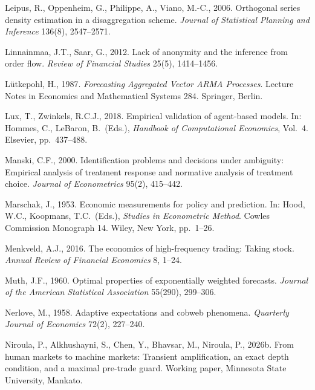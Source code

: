 \documentclass[11pt,letterpaper]{article}
\theoremstyle{definition}
\begin{document}
\begin{list}{}{\footnotesize\linespread{0.89}\selectfont\setlength{\leftmargin}{1.3em}\setlength{\itemindent}{-1.8em}\setlength{\itemsep}{0pt}\setlength{\parsep}{0pt}}
\item Leipus, R., Oppenheim, G., Philippe, A., Viano, M.-C., 2006. Orthogonal series density estimation in a disaggregation scheme. \emph{Journal of Statistical Planning and Inference} 136(8), 2547--2571.

\item Linnainmaa, J.T., Saar, G., 2012. Lack of anonymity and the inference from order flow. \emph{Review of Financial Studies} 25(5), 1414--1456.

\item L\"utkepohl, H., 1987. \emph{Forecasting Aggregated Vector ARMA Processes}. Lecture Notes in Economics and Mathematical Systems 284. Springer, Berlin.

\item Lux, T., Zwinkels, R.C.J., 2018. Empirical validation of agent-based models. In: Hommes, C., LeBaron, B.\ (Eds.), \emph{Handbook of Computational Economics}, Vol.~4. Elsevier, pp.\ 437--488.

\item Manski, C.F., 2000. Identification problems and decisions under ambiguity: Empirical analysis of treatment response and normative analysis of treatment choice. \emph{Journal of Econometrics} 95(2), 415--442.

\item Marschak, J., 1953. Economic measurements for policy and prediction. In: Hood, W.C., Koopmans, T.C.\ (Eds.), \emph{Studies in Econometric Method}. Cowles Commission Monograph 14. Wiley, New York, pp.\ 1--26.

\item Menkveld, A.J., 2016. The economics of high-frequency trading: Taking stock. \emph{Annual Review of Financial Economics} 8, 1--24.

\item Muth, J.F., 1960. Optimal properties of exponentially weighted forecasts. \emph{Journal of the American Statistical Association} 55(290), 299--306.

\item Nerlove, M., 1958. Adaptive expectations and cobweb phenomena. \emph{Quarterly Journal of Economics} 72(2), 227--240.

\item Niroula, P., Alkhushayni, S., Chen, Y., Bhavsar, M., Niroula, P., 2026b. From human markets to machine markets: Transient amplification, an exact depth condition, and a maximal pre-trade guard. Working paper, Minnesota State University, Mankato.


\end{list}
\end{document}

